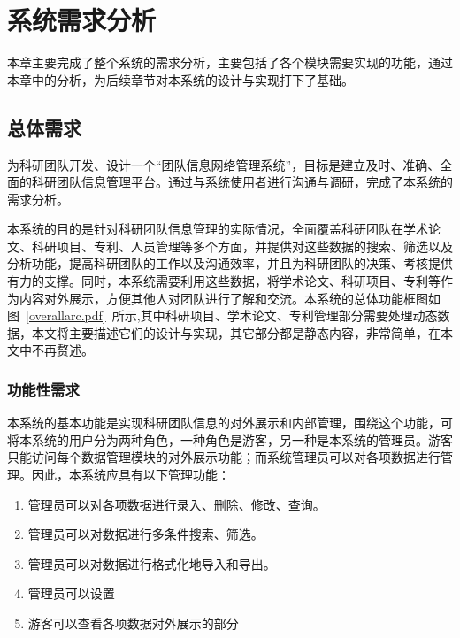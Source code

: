 \chapter{系统需求分析}

本章主要完成了整个系统的需求分析，主要包括了各个模块需要实现的功能，通过本章中的分析，为后续章节对本系统的设计与实现打下了基础。

\section{总体需求}
为科研团队开发、设计一个“团队信息网络管理系统”，目标是建立及时、准确、全面的科研团队信息管理平台。通过与系统使用者进行沟通与调研，完成了本系统的需求分析。

本系统的目的是针对科研团队信息管理的实际情况，全面覆盖科研团队在学术论文、科研项目、专利、人员管理等多个方面，并提供对这些数据的搜索、筛选以及分析功能，提高科研团队的工作以及沟通效率，并且为科研团队的决策、考核提供有力的支撑。同时，本系统需要利用这些数据，将学术论文、科研项目、专利等作为内容对外展示，方便其他人对团队进行了解和交流。本系统的总体功能框图如图~\ref{overallarc.pdf}~所示,其中科研项目、学术论文、专利管理部分需要处理动态数据，本文将主要描述它们的设计与实现，其它部分都是静态内容，非常简单，在本文中不再赘述。


\subsection{功能性需求}

本系统的基本功能是实现科研团队信息的对外展示和内部管理，围绕这个功能，可将本系统的用户分为两种角色，一种角色是游客，另一种是本系统的管理员。游客只能访问每个数据管理模块的对外展示功能；而系统管理员可以对各项数据进行管理。因此，本系统应具有以下管理功能：


\begin{enumerate}
\item 管理员可以对各项数据进行录入、删除、修改、查询。
\item 管理员可以对数据进行多条件搜索、筛选。
\item 管理员可以对数据进行格式化地导入和导出。
\item 管理员可以设置
\item 游客可以查看各项数据对外展示的部分
\end{enumerate}

